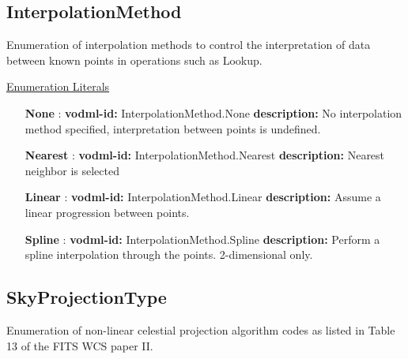   \subsection{InterpolationMethod}
  \label{sect:InterpolationMethod}

  Enumeration of interpolation methods to control the interpretation of data between known points in operations such as Lookup.

  \noindent \underline{Enumeration Literals}
  \vspace{-\parsep}
  \small
  \begin{itemize}
  
    \item[\textbf{None}]: \textbf{vodml-id:} InterpolationMethod.None \newline
          \textbf{description:} No interpolation method specified, interpretation between points is undefined.
    \item[\textbf{Nearest}]: \textbf{vodml-id:} InterpolationMethod.Nearest \newline
          \textbf{description:} Nearest neighbor is selected
    \item[\textbf{Linear}]: \textbf{vodml-id:} InterpolationMethod.Linear \newline
          \textbf{description:} Assume a linear progression between points.
    \item[\textbf{Spline}]: \textbf{vodml-id:} InterpolationMethod.Spline \newline
          \textbf{description:} Perform a spline interpolation through the points. 2-dimensional only.
  \end{itemize}
  \normalsize

  \subsection{SkyProjectionType}
  \label{sect:SkyProjectionType}

  Enumeration of non-linear celestial projection algorithm codes as listed in Table 13 of the FITS WCS paper II.

